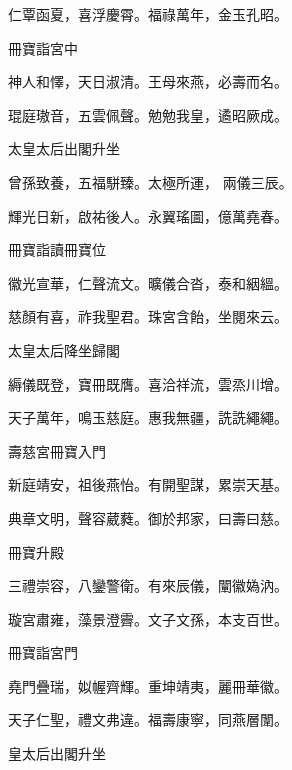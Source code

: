 \begin{pinyinscope}
 仁覃函夏，喜浮慶霄。福祿萬年，金玉孔昭。



 冊寶詣宮中



 神人和懌，天日淑清。王母來燕，必壽而名。



 琨庭璈音，五雲佩聲。勉勉我皇，遹昭厥成。



 太皇太后出閣升坐



 曾孫致養，五福駢臻。太極所運，
 兩儀三辰。



 輝光日新，啟祐後人。永翼瑤圖，億萬堯春。



 冊寶詣讀冊寶位



 徽光宣華，仁聲流文。曠儀合沓，泰和絪縕。



 慈顏有喜，祚我聖君。珠宮含飴，坐閱來云。



 太皇太后降坐歸閣



 縟儀既登，寶冊既膺。喜洽祥流，雲烝川增。



 天子萬年，鳴玉慈庭。惠我無疆，詵詵繩繩。



 壽慈宮冊寶入門



 新庭靖安，祖後燕怡。有開聖謀，累崇天基。



 典章文明，聲容葳蕤。御於邦家，曰壽曰慈。



 冊寶升殿



 三禮崇容，八鑾警衛。有來辰儀，闡徽媯汭。



 璇宮肅雍，藻景澄霽。文子文孫，本支百世。



 冊寶詣宮門



 堯門疊瑞，姒幄齊輝。重坤靖夷，麗冊華徽。



 天子仁聖，禮文弗違。福壽康寧，同燕層闈。



 皇太后出閣升坐




\end{pinyinscope}
